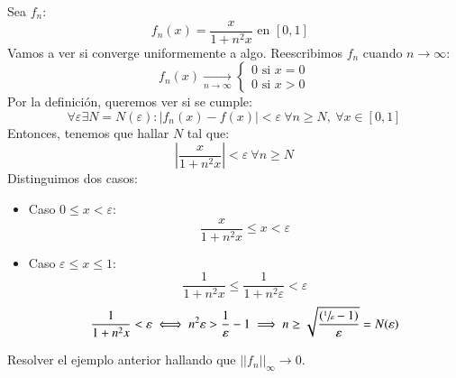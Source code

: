 \begin{eg}
    Sea $f_n$:
    $$
        f_n(x) = \frac{x}{1+n^2x} \text{ en $[0,1]$ }
    $$
    Vamos a ver si converge uniformemente a algo.
    Reescribimos $f_n$ cuando $n \to \infty$:
    $$
        f_n(x) \xrightarrow[n \to \infty]{}
        \begin{cases}
            0 \text{ si } x = 0\\
            0 \text{ si } x > 0
        \end{cases}
    $$
    Por la definición, queremos ver si se cumple:
    $$
        \forall \varepsilon \exists N=N(\varepsilon) : |f_n(x) - f(x)| < \varepsilon\ \forall n \geq N,\ \forall x \in [0,1]
    $$
    Entonces, tenemos que hallar $N$ tal que:
    $$
        \left|  \frac{x}{1+n^2x} \right| < \varepsilon\ \forall n \geq N
    $$
    Distinguimos dos casos:
    \begin{itemize}
        \item Caso $0 \leq x < \varepsilon$:
        $$
            \frac{x}{1+n^2x} \leq x < \varepsilon
        $$
        \item Caso $\varepsilon \leq x \leq 1$:
        $$
            \frac{1}{1+n^2x} \leq \frac{1}{1+n^2\varepsilon} < \varepsilon
        $$
        $$
            \frac{1}{1+n^2x} < \varepsilon \iff n^2\varepsilon > \frac{1}{\varepsilon} - 1 \implies n \geq \sqrt{\frac{(\sfrac{1}{\varepsilon} - 1)}{\varepsilon}} = N(\varepsilon)
        $$
    \end{itemize}
\end{eg}

\begin{th_ex}
    Resolver el ejemplo anterior hallando que $||f_n||_\infty \to 0$.
\end{th_ex}

